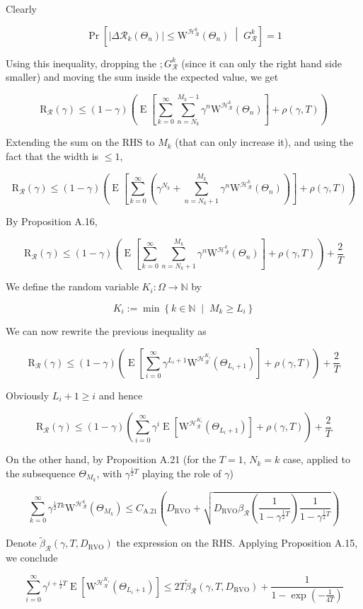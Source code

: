 \documentclass[a4paper]{article}
\newcommand{\AP}[1]{\left(#1\right)}
\newcommand{\AB}[1]{\left[#1\right]}
\newcommand{\ABM}[2]{\left[#1\;\middle\vert\;#2\right]}
\newcommand{\ACM}[2]{\left\{#1\;\middle\vert\;#2\right\}}
\newcommand{\Abs}[1]{\left\vert #1 \right\vert}
\newcommand{\CPb}[2]{\operatorname{Pr}\ABM{#1}{#2}}
\newcommand{\E}[1]{\operatorname{E}\AB{#1}}
\newcommand{\Nats}{\mathbb{N}}
\newcommand{\R}{\mathcal{R}}
\newcommand{\Hy}{\mathcal{H}}
\newcommand{\DRVO}{D_{\mathrm{RVO}}}
\newcommand{\Reg}{\mathrm{R}}
\newcommand{\ET}{N}
\newcommand{\IT}{M}
\newcommand{\CSE}{G}
\newcommand{\W}{\mathrm{W}}
\begin{document}
Clearly

$$\CPb{\Abs{\Delta\R_k\AP{\Theta_n}}\leq\W^{\Hy_\R^k}\AP{\Theta_n}}{\CSE_\R^k}=1$$

Using this inequality, dropping the $;G_\R^k$ (since it can only the right hand side smaller) and moving the sum inside the expected value, we get

$$\Reg_\R(\gamma)\leq(1-\gamma)\AP{\E{\sum_{k=0}^\infty\sum_{n=\ET_k}^{\IT_k-1}\gamma^{n}\W^{\Hy_\R^k}\AP{\Theta_n}}+\rho(\gamma,T)}$$

Extending the sum on the RHS to $M_k$ (that can only increase it), and using the fact that the width is $\leq1$,

$$\Reg_\R(\gamma)\leq(1-\gamma)\AP{\E{\sum_{k=0}^\infty\AP{\gamma^{N_k}+\sum_{n=\ET_k+1}^{\IT_k}\gamma^{n}\W^{\Hy_\R^k}\AP{\Theta_n}}}+\rho(\gamma,T)}$$

By Proposition A.16,

$$\Reg_\R(\gamma)\leq(1-\gamma)\AP{\E{\sum_{k=0}^\infty\sum_{n=\ET_k+1}^{\IT_k}\gamma^{n}\W^{\Hy_\R^k}\AP{\Theta_n}}+\rho(\gamma,T)}+\frac{2}{T}$$

We define the random variable $K_i:\Omega\rightarrow\Nats$ by

$$K_i:=\min\ACM{k\in\Nats}{\IT_k\geq L_i}$$

We can now rewrite the previous inequality as

$$\Reg_\R(\gamma)\leq(1-\gamma)\AP{\E{\sum_{i=0}^\infty\gamma^{L_i+1}\W^{\Hy_\R^{K_i}}\AP{\Theta_{L_i+1}}}+\rho(\gamma,T)}+\frac{2}{T}$$

Obviously $L_i+1\geq i$ and hence

$$\Reg_\R(\gamma)\leq(1-\gamma)\AP{\sum_{i=0}^\infty\gamma^{i}\E{\W^{\Hy_\R^{K_i}}\AP{\Theta_{L_i+1}}}+\rho(\gamma,T)}+\frac{2}{T}$$

On the other hand, by Proposition A.21 (for the $T=1$, $N_k=k$ case, applied to the subsequence $\Theta_{M_k}$, with $\gamma^{\frac{1}{2}T}$ playing the role of $\gamma$)

$$\sum_{k=0}^\infty\gamma^{\frac{1}{2}Tk}\W^{\Hy_\R^{k}}\AP{\Theta_{M_k}}\leq C_{\text{A.21}}\AP{\DRVO +\sqrt{\DRVO\beta_\R\AP{\frac{1}{1-\gamma^{\frac{1}{2}T}}}\frac{1}{1-\gamma^{\frac{1}{2}T}}}}$$

Denote $\tilde{\beta}_\R(\gamma,T,\DRVO)$ the expression on the RHS. Applying Proposition A.15, we conclude

$$\sum_{i=0}^\infty\gamma^{i+\frac{1}{2}T}\E{\W^{\Hy_\R^{K_i}}\AP{\Theta_{L_i+1}}}\leq 2T\tilde{\beta}_\R(\gamma,T,\DRVO)+\frac{1}{1-\exp\AP{-\frac{1}{4T}}}$$
\end{document}
